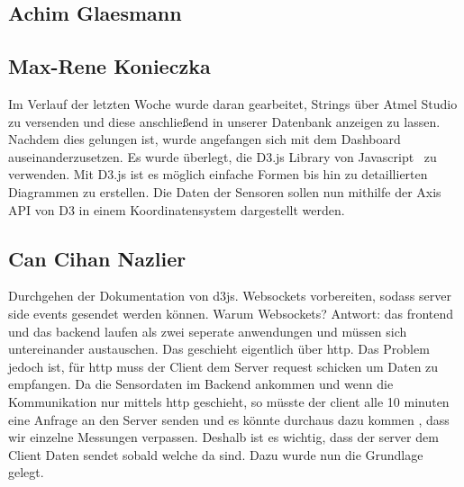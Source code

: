 \documentclass[]{article}
\begin{document}
\subsection{Achim Glaesmann}


\subsection{Max-Rene Konieczka}
Im Verlauf der letzten Woche wurde daran gearbeitet, Strings über Atmel Studio zu versenden und diese anschließend in unserer Datenbank anzeigen zu lassen. Nachdem dies gelungen ist, wurde angefangen sich mit dem Dashboard auseinanderzusetzen. Es wurde überlegt, die D3.js Library von Javascript~\cite{D3JS} zu verwenden. Mit D3.js ist es möglich einfache Formen bis hin zu detaillierten Diagrammen zu erstellen.
Die Daten der Sensoren sollen nun mithilfe der Axis API von D3 in einem Koordinatensystem dargestellt werden. 
\subsection{Can Cihan Nazlier}
Durchgehen der Dokumentation von d3js. Websockets vorbereiten, sodass server side events gesendet werden können. Warum Websockets?
Antwort: das frontend und das backend laufen als zwei seperate anwendungen und müssen sich untereinander austauschen. Das geschieht eigentlich über http. Das Problem jedoch ist,
für http muss der Client dem Server request schicken um Daten zu empfangen. Da die Sensordaten im Backend ankommen und wenn die Kommunikation nur mittels http geschieht, so müsste der client alle 10 minuten eine Anfrage an den Server senden und es könnte durchaus dazu kommen , dass wir einzelne Messungen verpassen. Deshalb ist es wichtig, dass der server dem Client Daten sendet sobald welche da sind. Dazu wurde nun die Grundlage gelegt. 


\printbibliography
\end{document}
